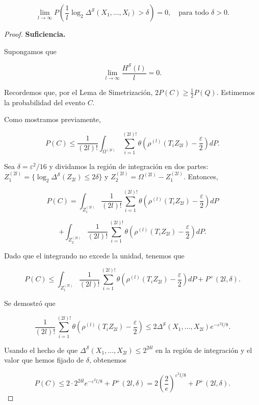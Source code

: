 \documentclass{report}
\begin{document}
\begin{equation}
    \lim_{l \to \infty} P\left( \frac{1}{l}\log_2 \Delta^{\mathcal{S}}(X_1, \dots, X_l) > \delta  \right) = 0, 
    \quad \text{para todo } \delta > 0.
\end{equation}
\begin{proof}


\textbf{Suficiencia.} 

Supongamos que

\[
\lim_{l \to \infty} \frac{H^{\mathcal{S}}(l)}{l} = 0.
\]

Recordemos que, por el Lema de Simetrización, \( 2P(C) \geq \frac{1}{2} P(Q) \). Estimemos la probabilidad del evento \( C \).\newline

Como mostramos previamente,

\[
P(C) \leq \frac{1}{(2l)!} \int_{\Omega^{(2l)}} \sum_{i=1}^{(2l)!} \theta \left( \rho^{(l)}(T_i Z_{2l}) - \frac{\varepsilon}{2} \right) dP.
\]

Sea \( \delta = \varepsilon^2 / 16 \) y dividamos la región de integración en dos partes: 
\( Z_1^{(2l)} = \{ \log_2 \Delta^{\mathcal{S}}(Z_{2l}) \leq 2\delta \} \) y 
\( Z_2^{(2l)} = \Omega^{(2l)} - Z_1^{(2l)} \). Entonces,

\[
P(C) = \int_{Z_1^{(2l)}} \frac{1}{(2l)!} \sum_{i=1}^{(2l)!} \theta \left( \rho^{(l)}(T_i Z_{2l}) - \frac{\varepsilon}{2} \right) dP
\]

\[
+ \int_{Z_2^{(2l)}} \frac{1}{(2l)!} \sum_{i=1}^{(2l)!} \theta \left( \rho^{(l)}(T_i Z_{2l}) - \frac{\varepsilon}{2} \right) dP.
\]

Dado que el integrando no excede la unidad, tenemos que

\[
P(C) \leq \int_{Z_1^{(2l)}} \frac{1}{(2l)!} \sum_{i=1}^{(2l)!} \theta \left( \rho^{(l)}(T_i Z_{2l}) - \frac{\varepsilon}{2} \right) dP + P^+(2l, \delta).
\]

Se demostró que

\[
\frac{1}{(2l)!} \sum_{i=1}^{(2l)!} \theta \left( \rho^{(l)}(T_i Z_{2l}) - \frac{\varepsilon}{2} \right) \leq 2 \Delta^{\mathcal{S}}(X_1, \dots, X_{2l}) e^{-\varepsilon^2 l / 8}.
\]

Usando el hecho de que \( \Delta^{\mathcal{S}}(X_1, \dots, X_{2l}) \leq 2^{2\delta l} \) en la región de integración y el valor que hemos
fijado de $\delta$, obtenemos

\[
P(C) \leq 2 \cdot 2^{2\delta l} e^{-\varepsilon^2 l / 8} + P^+(2l, \delta) = 2\left(\frac{2}{e}\right)^{\varepsilon^2 l / 8} + P^+(2l, \delta).
\]


\end{proof}
\end{document}
